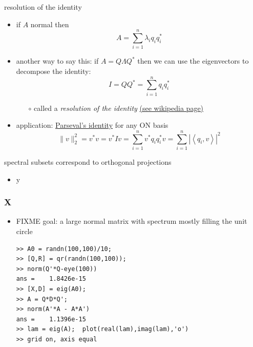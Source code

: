 \documentclass[10pt,hyperref]{beamer}
\newcommand{\ip}[2]{\left<#1,#2\right>}
\begin{document}
\begin{frame}{resolution of the identity}

\begin{itemize}
\item if $A$ normal then
    $$A = \sum_{i=1}^n \lambda_i q_i q_i^*$$
\item another way to say this: if $A=Q\Lambda Q^*$ then we can use the eigenvectors to decompose the identity:
    $$I = Q Q^* = \sum_{i=1}^n q_i q_i^*$$

    \vspace{-2mm}
    \begin{itemize}
    \item[$\circ$] called a \emph{resolution of the identity} \href{https://en.wikipedia.org/wiki/Spectral_theory\#Resolution_of_the_identity}{(see wikipedia page)}
    \end{itemize}
\item application: \href{https://en.wikipedia.org/wiki/Parseval's_identity}{Parseval's identity} for any ON basis
    $$\|v\|_2^2 = v^* v = v^* I v = \sum_{i=1}^n v^* q_i q_i^* v = \sum_{i=1}^n |\ip{q_i}{v}|^2$$
\end{itemize}
\end{frame}


\begin{frame}{spectral subsets correspond to orthogonal projections}

\begin{itemize}
\item y
\end{itemize}
\end{frame}


\begin{frame}[fragile]
\frametitle{X}

\begin{itemize}
\item FIXME  goal: a large normal matrix with spectrum mostly filling the unit circle

\begin{Verbatim}[fontsize=\scriptsize]
>> A0 = randn(100,100)/10;
>> [Q,R] = qr(randn(100,100));
>> norm(Q'*Q-eye(100))
ans =    1.8426e-15
>> [X,D] = eig(A0);
>> A = Q*D*Q';
>> norm(A'*A - A*A')
ans =    1.1396e-15
>> lam = eig(A);  plot(real(lam),imag(lam),'o')
>> grid on, axis equal
\end{Verbatim}

\end{itemize}
\end{frame}
\end{document}
